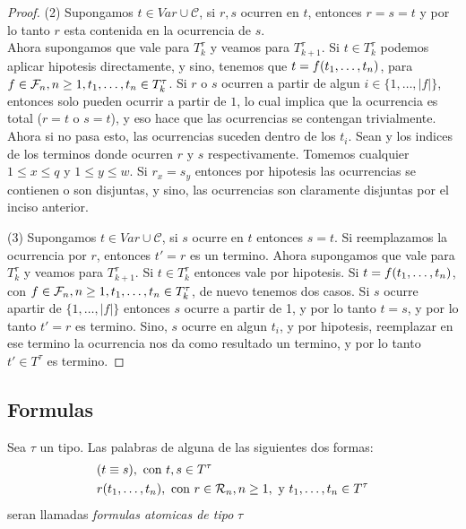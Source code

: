 \begin{proof}
  (2) Supongamos $t \in Var \cup \mathcal{C}$, si $r, s$ ocurren en $t$, entonces $r=s=t$ y por lo tanto $r$ esta contenida en la ocurrencia de $s$.\\
  Ahora supongamos que vale para $T^\tau_{k}$ y veamos para $T^\tau_{k+1}$. Si $t\in T^\tau_{k}$ podemos aplicar hipotesis directamente, y sino, tenemos que 
  $t=f(t_{1}, \dots, t_{n})$, para $f\in\mathcal{F}_n,n\geq1,t_{1}, \dots, t_{n}\in T^\tau_k$. Si $r$ o $s$ ocurren a partir de algun $i\in\{1,\dots,|f|\}$, entonces
  solo pueden ocurrir a partir de $1$, lo cual implica que la ocurrencia es total ($r = t$ o $s = t$), y eso hace que las ocurrencias se contengan trivialmente. Ahora si no pasa esto, las ocurrencias suceden dentro de los $t_i$. Sean 
   y  los indices de los terminos donde ocurren $r$ y $s$ respectivamente. Tomemos cualquier $1\leq x\leq q$ y $1\leq y\leq w$. Si $r_x = s_y$ entonces 
  por hipotesis las ocurrencias se contienen o son disjuntas, y sino, las ocurrencias son claramente disjuntas por el inciso anterior.

  (3) Supongamos $t\in Var \cup \mathcal{C}$, si $s$ ocurre en $t$ entonces $s = t$. Si reemplazamos la ocurrencia por $r$, entonces $t' = r$ es un termino.
  Ahora supongamos que vale para $T^\tau_k$ y veamos para $T^\tau_{k+1}$. Si $t\in T^\tau_k$ entonces vale por hipotesis. Si $t=f(t_{1}, \dots, t_{n})$, 
  con $f\in\mathcal{F}_n, n\geq1, t_{1}, \dots, t_{n}\in T^\tau_k$, de nuevo tenemos dos casos. Si $s$ ocurre apartir de $\{1,\dots,|f|\}$
  entonces $s$ ocurre a partir de 1, y por lo tanto $t=s$, y por lo tanto $t'=r$ es termino. Sino, $s$ ocurre en algun $t_i$, y por hipotesis, reemplazar en ese termino la ocurrencia nos da como resultado un termino,
  y por lo tanto $t'\in T^\tau$ es termino.

\end{proof}

\subsection{Formulas}

\begin{definition}
  Sea $\tau$ un tipo. Las palabras de alguna de las siguientes dos formas:
  \begin{alignat*}{3}
    &(t \equiv s), \text{ con } t, s \in T^\tau\\
    &r(t_{1}, \dots, t_{n}), \text{ con } r \in \mathcal{R}_n, n \geq 1, \text{ y } t_{1}, \dots, t_{n} \in T^\tau
  \end{alignat*}
  seran llamadas \emph{formulas atomicas de tipo} $\tau$
\end{definition}


